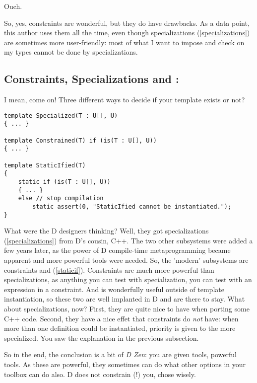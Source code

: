 Ouch. 

So, yes, constraints are wonderful, but they do have drawbacks. As a data point, this author uses them all the time, even though specializations (\ref{specializations}) are sometimes more user-friendly: most of what I want to impose and check on my types cannot be done by specializations. 

\subsection{Constraints, Specializations and :}
\label{constraintsorspecializations}

I mean, come on! Three different ways to decide if your template exists or not? 

\begin{verbatim}
template Specialized(T : U[], U)
{ ... }

template Constrained(T) if (is(T : U[], U))
{ ... }

template StaticIfied(T)
{
    static if (is(T : U[], U))
    { ... }
    else // stop compilation
        static assert(0, "StaticIfied cannot be instantiated.");
}
\end{verbatim}

What were the D designers thinking? Well, they got specializations (\ref{specializations}) from D's cousin, C++. The two other subsystems were added a few years later, as the power of D compile-time metaprogramming became apparent and more powerful tools were needed. So, the 'modern' subsystems are constraints and  (\ref{staticif}). Constraints are much more powerful than specializations, as anything you can test with specialization, you can test with an  expression in a constraint. And  is wonderfully useful outside of template instantiation, so these two are well implanted in D and are there to stay.
What about specializations, now? First, they are quite nice to have when porting some C++ code. Second, they have a nice effet that constraints do \emph{not} have: when more than one definition could be instantiated, priority is given to the more specialized. You saw the explanation in the previous subsection.

So in the end, the conclusion is a bit of \emph{D Zen}: you are given tools, powerful tools. As these are powerful, they sometimes can do what other options in your toolbox can do also. D does not constrain (!) you, chose wisely.

